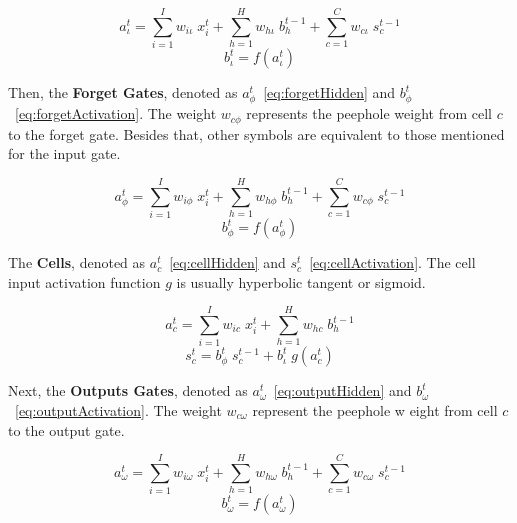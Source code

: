 \begin{equation} \label{eq:inputHidden}
    a_\iota^t = \sum_{i=1}^I w_{i\iota} \; x_i^t + \sum_{h=1}^H w_{h\iota} \; b_h^{t-1} + \sum_{c=1}^C w_{c\iota} \; s_c^{t-1}
\end{equation}
\begin{equation} \label{eq:inputActivation}
    b_\iota^t = f(a_\iota^t)
\end{equation}

Then, the \textbf{Forget Gates}, denoted as $a_\phi^t$~\ref{eq:forgetHidden} and 
$b_\phi^t$~\ref{eq:forgetActivation}. The weight $w_{c\phi}$ represents the peephole weight 
from cell $c$ to the forget gate. Besides that, other symbols are equivalent to those 
mentioned for the input gate.

\begin{equation} \label{eq:forgetHidden}
    a_\phi^t = \sum_{i=1}^I w_{i\phi} \; x_i^t + \sum_{h=1}^H w_{h\phi} \; b_h^{t-1} + \sum_{c=1}^C w_{c\phi} \; s_c^{t-1}
\end{equation}
\begin{equation} \label{eq:forgetActivation}
    b_\phi^t = f(a_\phi^t)
\end{equation}

The \textbf{Cells}, denoted as $a_c^t$~\ref{eq:cellHidden} and $s_c^t$~\ref{eq:cellActivation}. The 
cell input activation function $g$ is usually hyperbolic tangent or sigmoid.

\begin{equation} \label{eq:cellHidden}
    a_c^t = \sum_{i=1}^I w_{ic} \; x_i^t + \sum_{h=1}^H w_{hc} \; b_h^{t-1}
\end{equation}
\begin{equation} \label{eq:cellActivation}
    s_c^t = b_\phi^t \; s_c^{t-1} + b_\iota^t \; g(a_c^t)
\end{equation}

Next, the \textbf{Outputs Gates}, denoted as $a_\omega^t$~\ref{eq:outputHidden} and 
$b_\omega^t$~\ref{eq:outputActivation}. The weight $w_{c\omega}$ represent the peephole w
eight from cell $c$ to the output gate.

\begin{equation} \label{eq:outputHidden}
    a_\omega^t = \sum_{i=1}^I w_{i\omega} \; x_i^t + \sum_{h=1}^H w_{h\omega} \; b_h^{t-1} + \sum_{c=1}^C w_{c\omega} \; s_c^{t-1}
\end{equation}
\begin{equation} \label{eq:outputActivation}
    b_\omega^t = f(a_\omega^t)
\end{equation}

